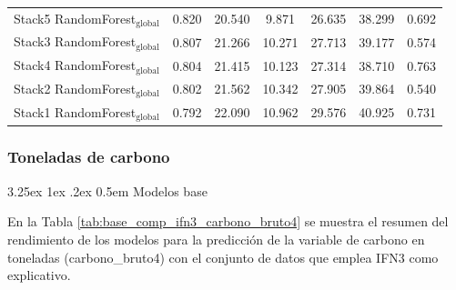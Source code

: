 \documentclass[a4paper,twocolumn]{article}
\makeatletter
\renewcommand\paragraph{\@startsection{paragraph}{4}{\z@}%
  {3.25ex \@plus1ex \@minus.2ex}%
  {0.5em}%
  {\normalfont\normalsize\bfseries}}
\newcommand{\subsubsubsection}[1]{\paragraph{#1}}
\makeatother
\begin{document}
\begin{table}
{\begin{tabular}{p{4.5cm}cccccc}
        Stack5 RandomForest$_{\text{global}}$ & 0.820 & 20.540 & 9.871 & 26.635 & 38.299 & 0.692 \\
        Stack3 RandomForest$_{\text{global}}$ & 0.807 & 21.266 & 10.271 & 27.713 & 39.177 & 0.574 \\
        Stack4 RandomForest$_{\text{global}}$ & 0.804 & 21.415 & 10.123 & 27.314 & 38.710 & 0.763 \\
        Stack2 RandomForest$_{\text{global}}$ & 0.802 & 21.562 & 10.342 & 27.905 & 39.864 & 0.540 \\
        Stack1 RandomForest$_{\text{global}}$ & 0.792 & 22.090 & 10.962 & 29.576 & 40.925 & 0.731 \\
            \bottomrule
    \end{tabular}
    }
\end{table}

\subsubsection{Toneladas de carbono}

\subsubsubsection{Modelos base}

En la Tabla \ref{tab:base_comp_ifn3_carbono_bruto4} se muestra el resumen del rendimiento de los modelos para la predicción de la variable de carbono en toneladas (carbono\_bruto4) con el conjunto de datos que emplea IFN3 como explicativo.
\end{document}
